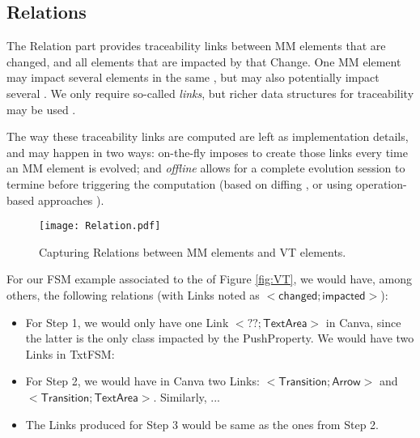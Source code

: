 \subsection{Relations}
\label{sec:Suggestion:Relation}

The \textsf{Relation} part provides traceability links between \textsf{MM}
elements that are \textsf{changed}, and all \viewtype elements that are 
\textsf{impacted} by that \textsf{Change}. One \textsf{MM} element
may impact several elements in the same \viewtype, but may also potentially
impact several \viewtypes. We only require so-called \emph{links}, but richer
data structures for traceability may be used \autocite{Batot-Cabot-Gerard:2021}.

The way these traceability links are computed are left as implementation
details, and may happen in two ways: \textsf{on-the-fly} imposes to create
those links every time an \textsf{MM} element is evolved; and \emph{offline}
allows for a complete evolution session to termine before triggering the
computation (based on diffing \autocite{Kehrer-Kelter-Taentzer:2011}, or using 
operation-based approaches \parencite{J:Lippe-Oosterom:1992}).

\begin{figure}[t]
    \centering
    \texttt{[image: Relation.pdf]}
    \caption{Capturing \textsf{Relation}s between \textsf{MM} elements and \textsf{VT} elements.}
    \label{fig:Relation}
\end{figure}

For our \textsf{FSM} example associated to the \viewtypes of Figure \ref{fig:VT},
we would have, among others, the following relations (with \textsf{Link}s noted 
as $\mathsf{<} \mathsf{changed} ; \mathsf{impacted} \mathsf{>}$):
\begin{itemize}
	\item For Step 1, we would only have one \textsf{Link} 
	$\mathsf{<} \mathsf{??} ; \mathsf{TextArea} \mathsf{>}$ in \textsf{Canva}, 
	since the latter is the only class impacted by the \textsf{PushProperty}. We would
	have two \textsf{Link}s in \textsf{TxtFSM}: 
	
	\item For Step 2, we would have in \textsf{Canva} two \textsf{Link}s: 
	$\mathsf{<} \mathsf{Transition} ; \mathsf{Arrow} \mathsf{>}$ and
	$\mathsf{<} \mathsf{Transition} ; \mathsf{TextArea} \mathsf{>}$. Similarly, ...
	
	\item The \textsf{Link}s produced for Step 3 would be same as the ones
	from Step 2.
\end{itemize}